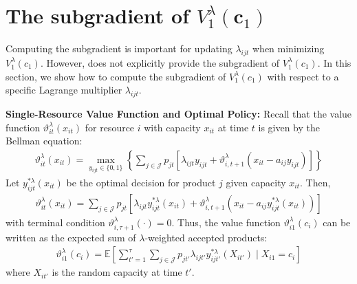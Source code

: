 \documentclass[11pt]{article}
\begin{document}
{\color{blue}

\section{The subgradient of $V_1^\lambda(\mathbf{c}_1)$}

\noindent
Computing the subgradient is important for updating $\lambda_{ijt}$ when minimizing $V^{\lambda}_{1}(c_{1})$.
However, \cite{topaloglu2009using} does not explicitly provide the subgradient of $V^{\lambda}_{1}(c_{1})$.
In this section, we show how to compute the subgradient of $V^{\lambda}_{1}(c_{1})$ with respect to a specific Lagrange multiplier $\lambda_{ijt}$.

\vspace{0.5cm}

\noindent
\textbf{Single-Resource Value Function and Optimal Policy:}
Recall that the value function $\vartheta^\lambda_{it}(x_{it})$ for resource $i$ with capacity $x_{it}$ at time $t$ is given by the Bellman equation:
\begin{align*}
\vartheta^\lambda_{it}(x_{it}) = \max_{y_{ijt} \in \{0,1\}} \left\{ \sum_{j \in \mathcal{J}} p_{jt} \left[ \lambda_{ijt} y_{ijt} + \vartheta^\lambda_{i, t+1}(x_{it} - a_{ij} y_{ijt}) \right] \right\}
\end{align*}
Let $y^{*\lambda}_{ijt}(x_{it})$ be the optimal decision for product $j$ given capacity $x_{it}$. Then,
\begin{align*}
\vartheta^\lambda_{it}(x_{it}) = \sum_{j \in \mathcal{J}} p_{jt} \left[ \lambda_{ijt} y^{*\lambda}_{ijt}(x_{it}) + \vartheta^\lambda_{i, t+1}(x_{it} - a_{ij} y^{*\lambda}_{ijt}(x_{it})) \right]
\end{align*}
with terminal condition $\vartheta^\lambda_{i, \tau+1}(\cdot) = 0$.
Thus, the value function $\vartheta^\lambda_{i1}(c_i)$ can be written as the expected sum of $\lambda$-weighted accepted products:
\begin{align*}
\vartheta^\lambda_{i1}(c_i) = \mathbb{E} \left[ \sum_{t'=1}^{\tau} \sum_{j \in \mathcal{J}} p_{jt'} \lambda_{ijt'} y^{*\lambda}_{ijt'}(X_{it'}) \mid X_{i1} = c_i \right]
\end{align*}
where $X_{it'}$ is the random capacity at time $t'$.

\vspace{0.5cm}

}
\end{document}
